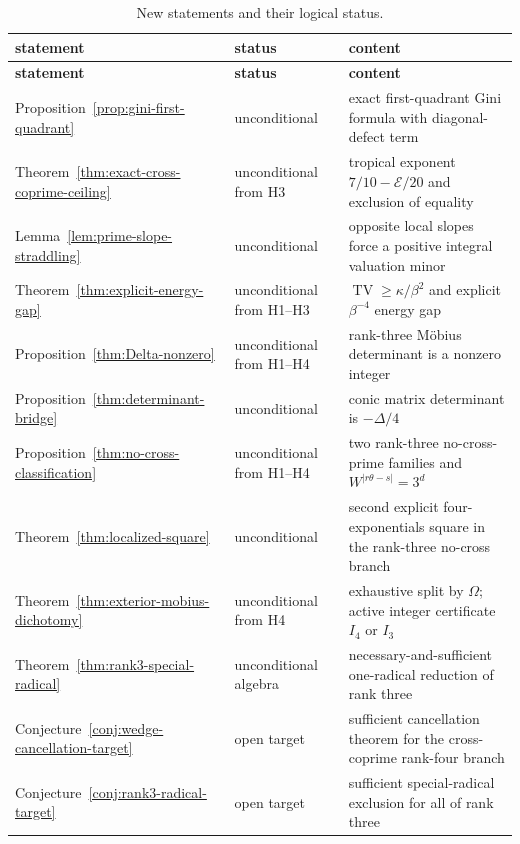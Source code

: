 \documentclass[11pt,oneside]{article}
\theoremstyle{research}
\theoremstyle{definition}
\newcommand{\E}{\mathcal E}
\newcommand{\TV}{\operatorname{TV}}
\begin{document}
\begin{longtable}{@{}p{}p{}p{}@{}}
\caption{New statements and their logical status.}\label{tab:new-ledger}\\
\toprule
\textbf{statement} & \textbf{status} & \textbf{content} \\
\midrule
\endfirsthead
\toprule
\textbf{statement} & \textbf{status} & \textbf{content} \\
\midrule
\endhead
Proposition~\ref{prop:gini-first-quadrant}
 & unconditional
 & exact first-quadrant Gini formula with diagonal-defect term \\
Theorem~\ref{thm:exact-cross-coprime-ceiling}
 & unconditional from H3
 & tropical exponent $7/10-\E/20$ and exclusion of equality \\
Lemma~\ref{lem:prime-slope-straddling}
 & unconditional
 & opposite local slopes force a positive integral valuation minor \\
Theorem~\ref{thm:explicit-energy-gap}
 & unconditional from H1--H3
 & $\TV\ge\kappa/\beta^2$ and explicit $\beta^{-4}$ energy gap \\
Proposition~\ref{thm:Delta-nonzero}
 & unconditional from H1--H4
 & rank-three M\"obius determinant is a nonzero integer \\
Proposition~\ref{thm:determinant-bridge}
 & unconditional
 & conic matrix determinant is $-\Delta/4$ \\
Proposition~\ref{thm:no-cross-classification}
 & unconditional from H1--H4
 & two rank-three no-cross-prime families and
   $W^{|r\theta-s|}=3^d$ \\
Theorem~\ref{thm:localized-square}
 & unconditional
 & second explicit four-exponentials square in the rank-three no-cross branch \\
Theorem~\ref{thm:exterior-mobius-dichotomy}
 & unconditional from H4
 & exhaustive split by $\Omega$; active integer certificate $I_4$ or $I_3$ \\
Theorem~\ref{thm:rank3-special-radical}
 & unconditional algebra
 & necessary-and-sufficient one-radical reduction of rank three \\
Conjecture~\ref{conj:wedge-cancellation-target}
 & open target
 & sufficient cancellation theorem for the cross-coprime rank-four branch \\
Conjecture~\ref{conj:rank3-radical-target}
 & open target
 & sufficient special-radical exclusion for all of rank three \\
\bottomrule
\end{longtable}
\end{document}
